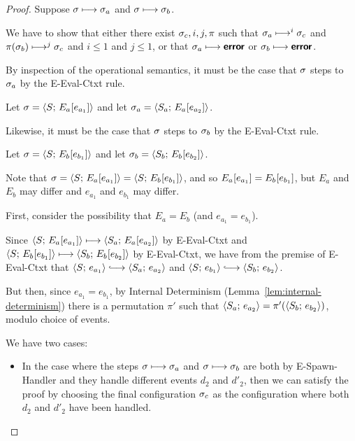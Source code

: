\begin{proof}
  Suppose $\sigma \longmapsto \sigma_a$ and $\sigma \longmapsto \sigma_b$.

  We have to show that either there exist $\sigma_c, i, j, \pi$ such
  that $\sigma_a \longmapsto^i \sigma_c$ and $\pi(\sigma_b) \longmapsto^j
  \sigma_c$ and $i \leq 1$ and $j \leq 1$, or that $\sigma_a \longmapsto
  \textbf{\textsf{error}}$ or $\sigma_b \longmapsto \textbf{\textsf{error}}$.

  By inspection of the operational semantics, it must be the case that
  $\sigma$ steps to $\sigma_a$ by the {\sc E-Eval-Ctxt} rule.

  Let $\sigma = \langle S;\, E_a\hspace{-0.5mm}\left[e_{a_1}\right] \rangle$ and let $\sigma_a =
  \langle S_a;\, E_a\hspace{-0.5mm}\left[e_{a_2}\right] \rangle$.

  Likewise, it must be the case that $\sigma$ steps to $\sigma_b$ by the
  {\sc E-Eval-Ctxt} rule.

  Let $\sigma = \langle S;\, E_b\hspace{-0.5mm}\left[e_{b_1}\right] \rangle$ and let $\sigma_b =
  \langle S_b;\, E_b\hspace{-0.5mm}\left[e_{b_2}\right] \rangle$.

  Note that $\sigma = \langle S;\, E_a\hspace{-0.5mm}\left[e_{a_1}\right] \rangle =
  \langle S;\, E_b\hspace{-0.5mm}\left[e_{b_1}\right] \rangle$, and so
  $E_a\hspace{-0.5mm}\left[e_{a_1}\right] = E_b\hspace{-0.5mm}\left[e_{b_1}\right]$, but $E_a$ and
  $E_b$ may differ and $e_{a_1}$ and $e_{b_1}$ may differ.

  First, consider the possibility that $E_a = E_b$ (and $e_{a_1} =
  e_{b_1}$).

  Since $\langle S;\, E_a\hspace{-0.5mm}\left[e_{a_1}\right] \rangle \longmapsto
  \langle S_a;\, E_a\hspace{-0.5mm}\left[e_{a_2}\right] \rangle$ by {\sc E-Eval-Ctxt} and
  $\langle S;\, E_b\hspace{-0.5mm}\left[e_{b_1}\right] \rangle \longmapsto
  \langle S_b;\, E_b\hspace{-0.5mm}\left[e_{b_2}\right] \rangle$ by {\sc E-Eval-Ctxt}, we have
  from the premise of {\sc E-Eval-Ctxt} that $\config{S}{e_{a_1}}
  \parstepsto \config{S_a}{e_{a_2}}$ and $\config{S}{e_{b_1}}
  \parstepsto \config{S_b}{e_{b_2}}$.

  But then, since $e_{a_1} = e_{b_1}$, by Internal Determinism
  (Lemma~\ref{lem:internal-determinism}) there is a permutation $\pi'$
  such that $\langle S_a;\, e_{a_2} \rangle = \pi'(\langle S_b;\, e_{b_2} \rangle)$,
  modulo choice of events.

  We have two cases:

  \begin{itemize}
  \item In the case where the steps $\sigma \longmapsto \sigma_a$ and
    $\sigma \longmapsto \sigma_b$ are both by {\sc E-Spawn-Handler} and
    they handle different events $d_2$ and $d'_2$, then we can satisfy
    the proof by choosing the final configuration $\sigma_c$ as the
    configuration where both $d_2$ and $d'_2$ have been handled.


\end{itemize}
\end{proof}
